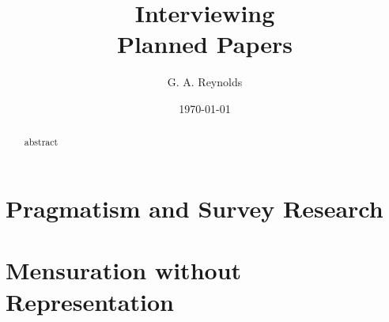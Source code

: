 \documentclass[11pt,twoside]{article}
\title{\SR{} Interviewing \\
\vspace{12pt}\Large{Planned Papers}}
\author{G. A. Reynolds}
\date{\today}
\newcommand{\SR}{Survey Research}
\begin{document}
\maketitle
\nocite{*}

\begin{abstract}
abstract
\end{abstract}

\tableofcontents

\newpage
\section{Pragmatism and \SR{}}

\begin{abstract}
\end{abstract}

\newpage
\section{Mensuration without Representation}
\end{document}
